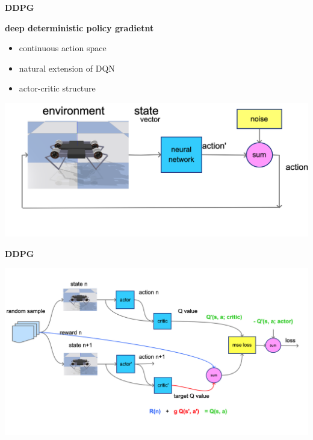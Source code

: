 \documentclass[xcolor=dvipsnames]{beamer}
\begin{document}
\begin{frame}{\bf DDPG}

  {\bf deep deterministic policy gradietnt}

  \begin{itemize}
    \item continuous action space
    \item natural extension of DQN
    \item actor-critic structure
  \end{itemize}

  {\centering \includegraphics[scale=0.15]{../diagrams/basic/ddpgnetwork.png}}

\end{frame}




\begin{frame}{\bf DDPG}

  {\centering \includegraphics[scale=0.12]{../diagrams/basic/ddpgtraining.png}}

\end{frame}
\end{document}
